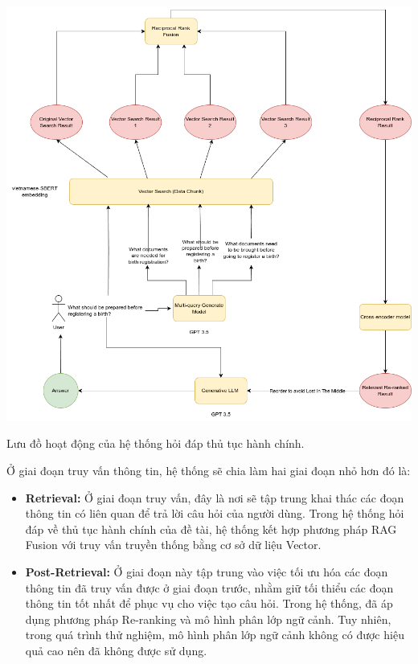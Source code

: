 \documentclass[a4paper, 12pt, openany]{book}
\begin{document}
\vspace{0.5cm}
\begin{minipage}{\linewidth}
    \centering
    \includegraphics[width=\linewidth]{./assets/images/RAG.drawio.png}
    \captionsetup{type=figure}
    \caption{Lưu đồ hoạt động của hệ thống hỏi đáp thủ tục hành chính.}
\end{minipage}
\vspace{0.5cm}

\vspace{0.2cm}
Ở giai đoạn truy vấn thông tin, hệ thống sẽ chia làm hai giai đoạn nhỏ hơn đó là:
\begin{itemize}
    \item \textbf{Retrieval:} Ở giai đoạn truy vấn, đây là nơi sẽ tập trung khai thác các đoạn thông tin có liên quan để trả lời câu hỏi của người dùng. Trong hệ thống hỏi đáp về thủ tục hành chính của đề tài,
    hệ thống kết hợp phương pháp RAG Fusion với truy vấn truyền thống bằng cơ sở dữ liệu Vector.
    \item \textbf{Post-Retrieval:} Ở giai đoạn này tập trung vào việc tối ưu hóa các đoạn thông tin đã truy vấn được ở giai đoạn trước, nhằm giữ tối thiểu các đoạn thông tin tốt nhất để phục vụ cho việc tạo câu hỏi.
    Trong hệ thống, đã áp dụng phương pháp Re-ranking và mô hình phân lớp ngữ cảnh. Tuy nhiên, trong quá trình thử nghiệm, mô hình phân lớp ngữ cảnh không có được hiệu quả cao nên đã không được sử dụng.
\end{itemize}
\end{document}
